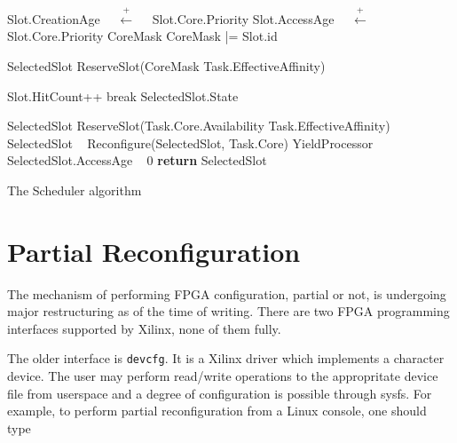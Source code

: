 \begin{algorithm}
\begin{algorithmic}[1]

	
		\State Slot.CreationAge ~~$\xleftarrow{\text{+}}$~~ Slot.Core.Priority\;
		\State Slot.AccessAge ~~$\xleftarrow{\text{+}}$~~ Slot.Core.Priority\;
	\EndIf
\EndFor
\State
\Repeat
	\State CoreMask \;
			
			\State CoreMask |= Slot.id\;
		\EndIf
	\EndFor

	\State SelectedSlot \gets ReserveSlot(CoreMask
	 Task.EffectiveAffinity) \;

			\State Slot.HitCount++\;	
			\State break\;
		\Else
			\State SelectedSlot.State \gets ~~ \emptyset\;
		\EndIf
	\EndIf
	
	\State SelectedSlot \gets ReserveSlot(Task.Core.Availability 
	 Task.EffectiveAffinity)\;
		\State SelectedSlot \gets ~ \emptyset\;
	\EndIf
	\State
		\State Reconfigure(SelectedSlot, Task.Core)\;
	\Else
		\State YieldProcessor\;	
	\EndIf
{}\;
\State
\State SelectedSlot.AccessAge \gets ~ 0\;
\State \textbf{return} SelectedSlot\;
\EndProcedure
\end{algorithmic}
\caption{The Scheduler algorithm}
\label{lst:scheduler}
\end{algorithm}

\section{Partial Reconfiguration}
\label{sec:linux-pr}

The mechanism of performing FPGA configuration, partial or not, 
is undergoing major restructuring as of the time of writing.
There are two FPGA programming interfaces supported by Xilinx, none of them fully.

The older interface is \texttt{devcfg}. It is a Xilinx driver which implements a character device. The user
may perform read/write operations to the appropritate device file from userspace and a degree of configuration
is possible through sysfs. For example, to perform partial reconfiguration from a Linux console, one should type


